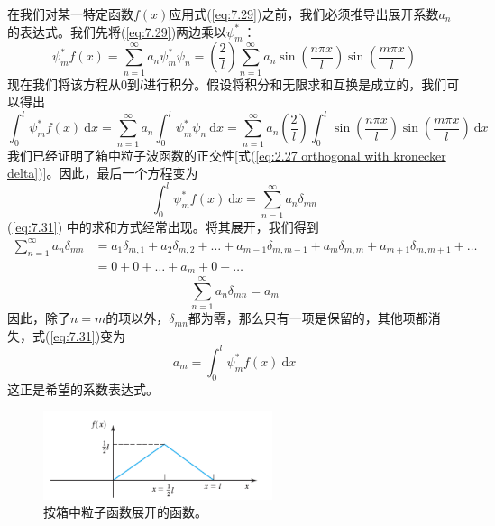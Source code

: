     在我们对某一特定函数$f\left(x\right)$应用式(\ref{eq:7.29})之前，我们必须推导出展开系数$a_n$的表达式。我们先将(\ref{eq:7.29})两边乘以$\psi_m^{\ast}$：
    \begin{equation}
        \psi_m^{\ast} f\left(x\right) = \sum_{n=1}^{\infty} a_n \psi_m^{\ast} \psi_n = \left(\frac{2}{l}\right) \sum_{n=1}^{\infty} a_n \sin\left(\frac{n\pi x}{l}\right) \sin\left(\frac{m\pi x}{l}\right)
        \label{eq:7.30}
    \end{equation}
    现在我们将该方程从$0$到$l$进行积分。假设将积分和无限求和互换是成立的，我们可以得出
    \begin{equation*}
        \int_{0}^{l} \psi_m^{\ast} f\left(x\right) \: \mathrm{d}x = \sum_{n=1}^{\infty} a_n \int_{0}^{l} \psi_m^{\ast} \psi_n \: \mathrm{d}x = \sum_{n=1}^{\infty} a_n \left(\frac{2}{l}\right) \int_{0}^{l} \sin\left(\frac{n\pi x}{l}\right) \sin\left(\frac{m\pi x}{l}\right) \: \mathrm{d}x
    \end{equation*}
    我们已经证明了箱中粒子波函数的正交性[式(\ref{eq:2.27 orthogonal with kronecker delta})]。因此，最后一个方程变为
    \begin{equation}
        \int_{0}^{l} \psi_m^{\ast} f\left(x\right) \: \mathrm{d}x = \sum_{n=1}^{\infty} a_n \delta_{mn}
        \label{eq:7.31}
    \end{equation}
    (\ref{eq:7.31}) 中的求和方式经常出现。将其展开，我们得到
    \begin{equation*}
        \begin{aligned}
            \sum_{n=1}^{\infty}a_n \delta_{mn} &= a_1 \delta_{m,1} + a_2 \delta_{m,2} + \ldots + a_{m-1} \delta_{m,m-1} + a_m \delta_{m,m} + a_{m+1} \delta_{m,m+1} + \ldots \\
            &= 0 + 0 + \ldots + a_m + 0 + \ldots
        \end{aligned}
    \end{equation*}
    \begin{equation}
        \sum_{n=1}^{\infty} a_n \delta_{mn} = a_m
        \label{eq:7.32}
    \end{equation}
    因此，除了$n=m$的项以外，$\delta_{mn}$都为零，那么只有一项是保留的，其他项都消失，式(\ref{eq:7.31})变为
    \begin{equation}
        a_m = \int_{0}^{l} \psi_m^{\ast} f\left(x\right) \: \mathrm{d}x
        \label{eq:7.33}
    \end{equation}
    这正是希望的系数表达式。
    \begin{figure}[ht]
        \centering
        \includegraphics[width=0.6\textwidth]{figures/7.1.png}
        \caption{按箱中粒子函数展开的函数。}
        \label{fig:7.1}
    \end{figure}

